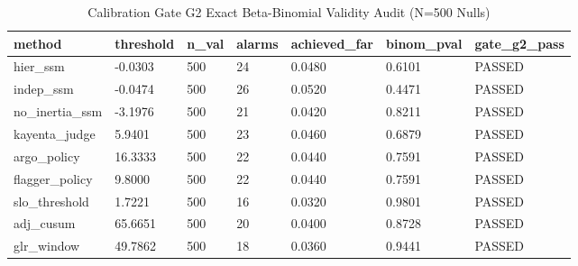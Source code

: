 \begin{table}[htbp]
\centering
\caption{Calibration Gate G2 Exact Beta-Binomial Validity Audit (N=500 Nulls)}
\label{tab:table_T5_calibration_gate_g2}
\begin{tabular}{lllllll}
\hline
method & threshold & n\_val & alarms & achieved\_far & binom\_pval & gate\_g2\_pass \\
\hline
hier\_ssm & -0.0303 & 500 & 24 & 0.0480 & 0.6101 & PASSED \\
indep\_ssm & -0.0474 & 500 & 26 & 0.0520 & 0.4471 & PASSED \\
no\_inertia\_ssm & -3.1976 & 500 & 21 & 0.0420 & 0.8211 & PASSED \\
kayenta\_judge & 5.9401 & 500 & 23 & 0.0460 & 0.6879 & PASSED \\
argo\_policy & 16.3333 & 500 & 22 & 0.0440 & 0.7591 & PASSED \\
flagger\_policy & 9.8000 & 500 & 22 & 0.0440 & 0.7591 & PASSED \\
slo\_threshold & 1.7221 & 500 & 16 & 0.0320 & 0.9801 & PASSED \\
adj\_cusum & 65.6651 & 500 & 20 & 0.0400 & 0.8728 & PASSED \\
glr\_window & 49.7862 & 500 & 18 & 0.0360 & 0.9441 & PASSED \\
\hline
\end{tabular}
\end{table}
